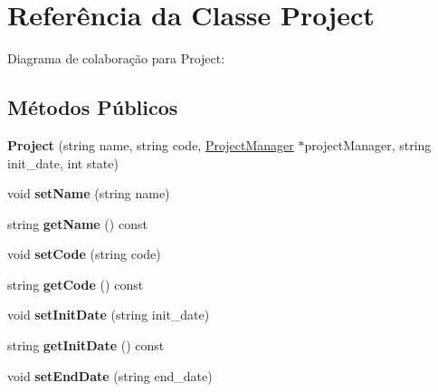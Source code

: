 \hypertarget{classProject}{}\section{Referência da Classe Project}
\label{classProject}


Diagrama de colaboração para Project\+:
\subsection*{Métodos Públicos}
\begin{DoxyCompactItemize}
\item 
{\bfseries Project} (string name, string code, \hyperlink{classProjectManager}{Project\+Manager} $\ast$project\+Manager, string init\+\_\+date, int state)\hypertarget{classProject_a19c69a04202c553bdabda1486ec15c00}{}\label{classProject_a19c69a04202c553bdabda1486ec15c00}

\item 
void {\bfseries set\+Name} (string name)\hypertarget{classProject_a912d82940bd261216daa890a979c543f}{}\label{classProject_a912d82940bd261216daa890a979c543f}

\item 
string {\bfseries get\+Name} () const \hypertarget{classProject_ac7a307d3691354452840e532b8f684ce}{}\label{classProject_ac7a307d3691354452840e532b8f684ce}

\item 
void {\bfseries set\+Code} (string code)\hypertarget{classProject_aaa53db8e9d5e28178afc9d538c98199a}{}\label{classProject_aaa53db8e9d5e28178afc9d538c98199a}

\item 
string {\bfseries get\+Code} () const \hypertarget{classProject_af4257546b23fc9378351298007b0d840}{}\label{classProject_af4257546b23fc9378351298007b0d840}

\item 
void {\bfseries set\+Init\+Date} (string init\+\_\+date)\hypertarget{classProject_a4465550db6e02c166cb4adf19fa0acf4}{}\label{classProject_a4465550db6e02c166cb4adf19fa0acf4}

\item 
string {\bfseries get\+Init\+Date} () const \hypertarget{classProject_a9414c914ce9c5153220f2edb7bc8dfd7}{}\label{classProject_a9414c914ce9c5153220f2edb7bc8dfd7}

\item 
void {\bfseries set\+End\+Date} (string end\+\_\+date)\hypertarget{classProject_ab6e5d8396068e75ddc3f8aeca1894712}{}\label{classProject_ab6e5d8396068e75ddc3f8aeca1894712}


\end{DoxyCompactItemize}
